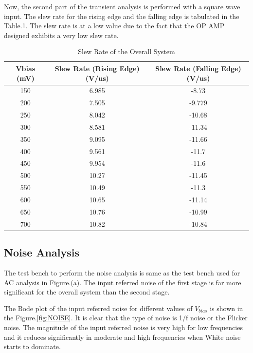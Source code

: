 Now, the second part of the transient analysis is performed with a square wave input. 
The slew rate for the rising edge and the falling edge is tabulated in the Table.\ref{tab:SLEW}. The slew rate is at a low value due to the fact that the OP AMP designed exhibits a very low slew rate.
 
\begin{table} [H]
\centering
\begin{tabular}{@{}ccc@{}}
\toprule
Vbias (mV)			& Slew Rate (Rising Edge)(V/us)			& Slew Rate (Falling Edge)(V/us)	 \\ \midrule
150					& 6.985	 					& -8.73					 \\
200					& 7.505 					& -9.779				 \\
250					& 8.042 					& -10.68				 \\
300					& 8.581 					& -11.34				 \\
350					& 9.095						& -11.66				 \\
400					& 9.561						& -11.7					 \\
450					& 9.954 					& -11.6					 \\
500					& 10.27						& -11.45				 \\
550					& 10.49	 					& -11.3					 \\
600					& 10.65 					& -11.14				 \\
650					& 10.76 					& -10.99				 \\
700 				& 10.82 					& -10.84				 \\
\bottomrule
\end{tabular}
\caption{Slew Rate of the Overall System}
\label{tab:SLEW}
\end{table}

\subsection{Noise Analysis}
The test bench to perform the noise analysis is same as the test bench used for AC analysis in Figure.(a). The input referred noise of the first stage is far more significant for the overall system than the second stage.

The Bode plot of the input referred noise for different values of $V_{bias}$ is shown in the Figure.\ref{fig:NOISE}. It is clear that the type of noise is 1/f noise or the Flicker noise. The magnitude of the input referred noise is very high for low frequencies and it reduces significantly in moderate and high frequencies when White noise starts to dominate.

